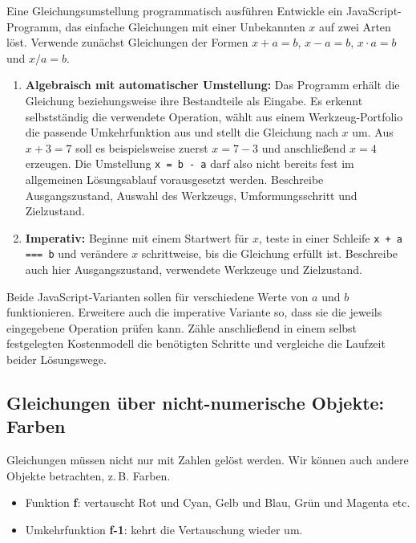 \documentclass{article}
\begin{document}
      \begin{uebung}{Eine Gleichungsumstellung programmatisch ausführen}
      Entwickle ein JavaScript-Programm, das einfache Gleichungen mit einer Unbekannten \(x\) auf zwei Arten löst. Verwende zunächst Gleichungen der Formen \(x+a=b\), \(x-a=b\), \(x\cdot a=b\) und \(x/a=b\).

      \begin{enumerate}
        \item \textbf{Algebraisch mit automatischer Umstellung:} Das Programm erhält die Gleichung beziehungsweise ihre Bestandteile als Eingabe. Es erkennt selbstständig die verwendete Operation, wählt aus einem Werkzeug-Portfolio die passende Umkehrfunktion aus und stellt die Gleichung nach \(x\) um. Aus \(x+3=7\) soll es beispielsweise zuerst \(x=7-3\) und anschließend \(x=4\) erzeugen. Die Umstellung \texttt{x = b - a} darf also nicht bereits fest im allgemeinen Lösungsablauf vorausgesetzt werden. Beschreibe Ausgangszustand, Auswahl des Werkzeugs, Umformungsschritt und Zielzustand.
        \item \textbf{Imperativ:} Beginne mit einem Startwert für \(x\), teste in einer Schleife \texttt{x + a === b} und verändere \(x\) schrittweise, bis die Gleichung erfüllt ist. Beschreibe auch hier Ausgangszustand, verwendete Werkzeuge und Zielzustand.
      \end{enumerate}

      Beide JavaScript-Varianten sollen für verschiedene Werte von \(a\) und \(b\) funktionieren. Erweitere auch die imperative Variante so, dass sie die jeweils eingegebene Operation prüfen kann. Zähle anschließend in einem selbst festgelegten Kostenmodell die benötigten Schritte und vergleiche die Laufzeit beider Lösungswege.
      \end{uebung}


        \subsection{Gleichungen über nicht-numerische Objekte: Farben}
        
Gleichungen müssen nicht nur mit Zahlen gelöst werden. Wir können auch andere Objekte betrachten, z.\,B. Farben.

        \begin{itemize}
          \item Funktion \textbf{f}: vertauscht Rot und Cyan, Gelb und Blau, Grün und Magenta etc.

          \item Umkehrfunktion \textbf{f-1}: kehrt die Vertauschung wieder um.

        \end{itemize}
        
\end{document}
